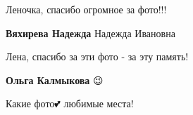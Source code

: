 
Леночка, спасибо огромное за фото!!!

\begin{itemize} %
\textbf{Вяхирева Надежда} Надежда Ивановна💋
\end{itemize} %


Лена, спасибо за эти фото - за эту память!

\begin{itemize} %
\textbf{Ольга Калмыкова} 😉
\end{itemize} %


Какие фото💕 любимые места!
